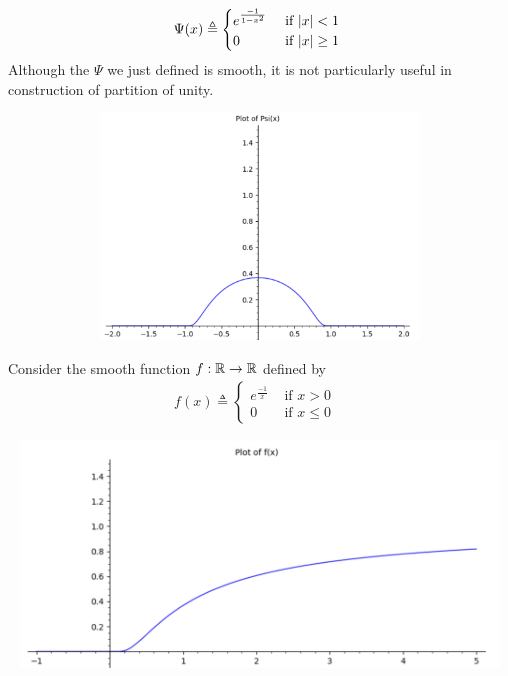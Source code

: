 \documentclass{report}
\begin{document}
\begin{mdframed}
\begin{align*}
\Psi (x)\triangleq \begin{cases}
  e^{\frac{-1}{1-x^2}}& \text{ if $\left|x\right|<1$ }\\
  0& \text{ if $\left|x\right|\geq 1$ }
\end{cases}
\end{align*}
Although the $\Psi$ we just defined is smooth, it is not particularly useful in construction of partition of unity.
\begin{center}
   \begin{minipage}{0.9\linewidth}  
       \centering
       \includegraphics[height=6cm,width=16cm]{Psi_graph}
   \end{minipage}
\end{center}
Consider the smooth function $f:\mathbb{R}\rightarrow \mathbb{R}$ defined by 
\begin{align*}
f(x)\triangleq \begin{cases}
  e^{\frac{-1}{x}}& \text{ if $x>0$ }\\
  0& \text{ if $x\leq 0$ }
\end{cases}
\end{align*}
\begin{center}
   \begin{minipage}{0.9\linewidth}  
       \centering
       \includegraphics[height=6cm,width=16cm]{f_graph}
   \end{minipage}

\end{center}
\end{mdframed}
\end{document}
